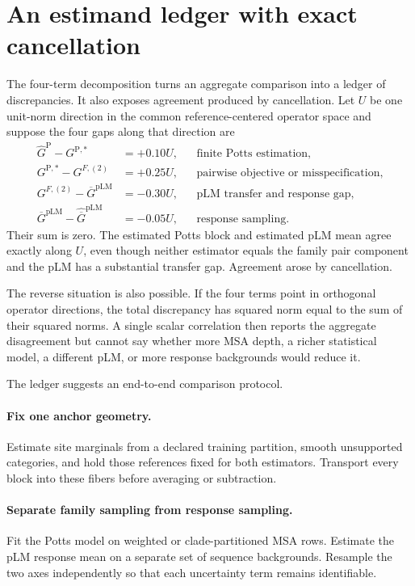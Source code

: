 \section*{An estimand ledger with exact cancellation}

The four-term decomposition turns an aggregate comparison into a ledger of discrepancies.  It also
exposes agreement produced by cancellation.  Let $U$ be one unit-norm direction in the common
reference-centered operator space and suppose the
four gaps along that direction are
\begin{equation}
\begin{aligned}
\widehat G^{\mathrm P}-G^{\mathrm{P},*}&=+0.10U,
&&\text{finite Potts estimation},\\
G^{\mathrm{P},*}-G^{F,(2)}&=+0.25U,
&&\text{pairwise objective or misspecification},\\
G^{F,(2)}-\overline G^{\mathrm{pLM}}&=-0.30U,
&&\text{pLM transfer and response gap},\\
\overline G^{\mathrm{pLM}}-\widehat{\overline G}^{\mathrm{pLM}}&=-0.05U,
&&\text{response sampling}.
\end{aligned}
\label{eq:book-estimand-cancellation}
\end{equation}
Their sum is zero.  The estimated Potts block and estimated pLM mean agree exactly along $U$, even
though neither estimator equals the family pair component and the pLM has a substantial transfer
gap.  Agreement arose by cancellation.

The reverse situation is also possible.  If the four terms point in orthogonal operator
directions, the total discrepancy has squared norm equal to the sum of their squared norms.  A
single scalar correlation then reports the aggregate disagreement but cannot say whether more MSA
depth, a richer statistical model, a different pLM, or more response backgrounds would reduce it.

The ledger suggests an end-to-end comparison protocol.

\paragraph{Fix one anchor geometry.}
Estimate site marginals from a declared training partition, smooth unsupported categories, and
hold those references fixed for both estimators.  Transport every block into these fibers before
averaging or subtraction.

\paragraph{Separate family sampling from response sampling.}
Fit the Potts model on weighted or clade-partitioned MSA rows.  Estimate the pLM response mean on a
separate set of sequence backgrounds.  Resample the two axes independently so that each uncertainty
term remains identifiable.

